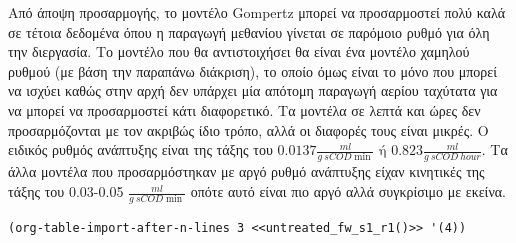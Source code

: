 \documentclass[11pt]{article}
\begin{document}
Από άποψη προσαρμογής, το μοντέλο Gompertz μπορεί να προσαρμοστεί πολύ καλά σε τέτοια δεδομένα όπου η παραγωγή μεθανίου γίνεται σε παρόμοιο ρυθμό για όλη την διεργασία. Το μοντέλο που θα αντιστοιχήσει θα είναι ένα μοντέλο χαμηλού ρυθμού (με βάση την παραπάνω διάκριση), το οποίο όμως είναι το μόνο που μπορεί να ισχύει καθώς στην αρχή δεν υπάρχει μία απότομη παραγωγή αερίου ταχύτατα για να μπορεί να προσαρμοστεί κάτι διαφορετικό. Τα μοντέλα σε λεπτά και ώρες δεν προσαρμόζονται με τον ακριβώς ίδιο τρόπο, αλλά οι διαφορές τους είναι μικρές. Ο ειδικός ρυθμός ανάπτυξης είναι της τάξης του \(0.0137 \frac{ml}{g ~ sCOD \min} \text{ ή } 0.823 \frac{ml}{g ~ sCOD ~ hour}\). Τα άλλα μοντέλα που προσαρμόστηκαν με αργό ρυθμό ανάπτυξης είχαν κινητικές της τάξης του 0.03-0.05 \(\frac{ml}{g ~ sCOD \min }\) οπότε αυτό είναι πιο αργό αλλά συγκρίσιμο με εκείνα.

\begin{verbatim}
(org-table-import-after-n-lines 3 <<untreated_fw_s1_r1()>> '(4))
\end{verbatim}
\end{document}
